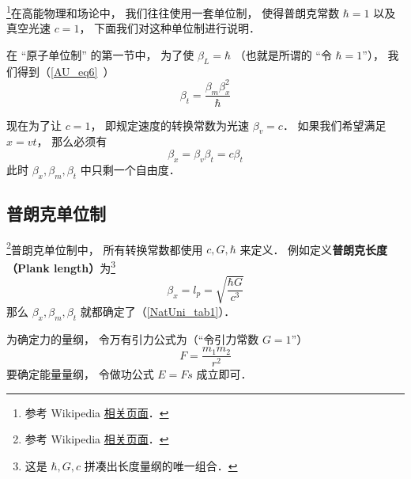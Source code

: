 
\begin{issues}
\issueDraft
\end{issues}


\footnote{参考 Wikipedia \href{https://en.wikipedia.org/wiki/Natural_units}{相关页面}．}在高能物理和场论中， 我们往往使用一套单位制， 使得普朗克常数 $\hbar = 1$ 以及真空光速 $c = 1$， 下面我们对这种单位制进行说明．

在 “原子单位制” 的第一节中， 为了使 $\beta_L = \hbar$ （也就是所谓的 “令 $\hbar = 1$”）， 我们得到（\autoref{AU_eq6}~）
\begin{equation}\label{NatUni_eq1}
\beta_t = \frac{\beta_m \beta_x^2}{\hbar}
\end{equation}

现在为了让 $c = 1$， 即规定速度的转换常数为光速 $\beta_v = c$． 如果我们希望满足 $x = vt$， 那么必须有
\begin{equation}
\beta_x = \beta_v \beta _t = c\beta_t
\end{equation}
此时 $\beta_x, \beta_m, \beta_t$ 中只剩一个自由度．

\subsection{普朗克单位制}
\footnote{参考 Wikipedia \href{https://en.wikipedia.org/wiki/Planck_units}{相关页面}．}普朗克单位制中， 所有转换常数都使用 $c, G, \hbar$ 来定义． 例如定义\textbf{普朗克长度（Plank length）}为\footnote{这是 $\hbar, G, c$ 拼凑出长度量纲的唯一组合．}
\begin{equation}
\beta_x = l_p = \sqrt{\frac{\hbar G}{c^3}}
\end{equation}
那么 $\beta_x, \beta_m, \beta_t$ 就都确定了（\autoref{NatUni_tab1}）．

为确定力的量纲， 令万有引力公式为（“令引力常数 $G = 1$”）
\begin{equation}
F = \frac{m_1 m_2}{r^2}
\end{equation}
要确定能量量纲， 令做功公式 $E = Fs$ 成立即可．

